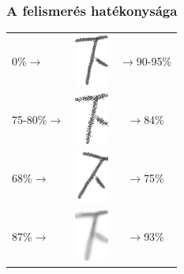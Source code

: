 \documentclass{beamer}
\newcommand\tab[1][1cm]{\hspace*{#1}}
\begin{document}
\begin{frame}[fragile]
\frametitle{A felismerés hatékonysága}

\begin{table}
\begin{tabular}{l c c}
0\%\tab $\rightarrow$\tab & \includegraphics[scale=0.5]{original} & \tab $\rightarrow$\tab 90-95\% \\
75-80\%\tab $\rightarrow$\tab & \includegraphics[scale=0.5]{noise} & \tab $\rightarrow$\tab 84\% \\
 68\%\tab $\rightarrow$\tab & \includegraphics[scale=0.5]{rotate} & \tab $\rightarrow$\tab 75\% \\
 87\%\tab $\rightarrow$\tab & \includegraphics[scale=0.5]{blur} & \tab $\rightarrow$\tab 93\% \\
\end{tabular}
\end{table}

\end{frame}
\end{document}
